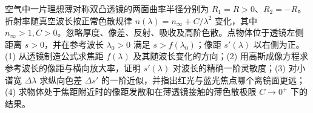 空气中一片理想薄对称双凸透镜的两面曲率半径分别为 \(R_1=R>0\)、\(R_2=-R\)。折射率随真空波长按正常色散规律 \(n(\lambda)=n_\infty+C/\lambda^2\) 变化，其中 \(n_\infty>1,C>0\)。忽略厚度、像差、反射、吸收及高阶色散。点物体位于透镜左侧距离 \(s>0\)，并在参考波长 \(\lambda_0>0\) 满足 \(s>f(\lambda_0)\)；像距 \(s'(\lambda)\) 以右侧为正。
(1) 从透镜制造公式求焦距 \(f(\lambda)\) 及其随波长变化的方向；(2) 用高斯成像方程求参考波长的像距与横向放大率，证明 \(s'(\lambda)\) 对波长的精确一阶灵敏度；(3) 对小谱宽 \(\Delta\lambda\) 求纵向色差 \(\Delta s'\) 的一阶近似，并指出红光与蓝光焦点哪个离镜面更远；(4) 求物体处于焦距附近时的像距发散和在薄透镜接触的薄色散极限 \(C\to0^+\) 下的结果。
